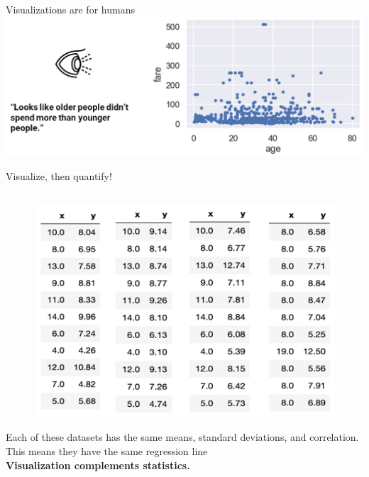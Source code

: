 \documentclass[aspectratio=169]{../latex_main/tntbeamer}  %
\begin{document}
	
	\begin{frame}{Visualizations are for humans}
	    \centering
	    \includegraphics[scale=.4]{Bild7}
	\end{frame}
	
	
	\begin{frame}{Visualize, then quantify!}
	    \begin{columns}
	    \begin{column}{.6\textwidth}
	        \begin{figure}
	            \centering
	            \vspace{-2em}
        	    \includegraphics[scale=.5]{Bild9}
	        \end{figure}
	     Each of these datasets has the same means, standard deviations, and correlation. This means they have the same regression line\\

	     \textbf{Visualization complements statistics.}


\end{column}
\end{columns}
\end{frame}
\end{document}
